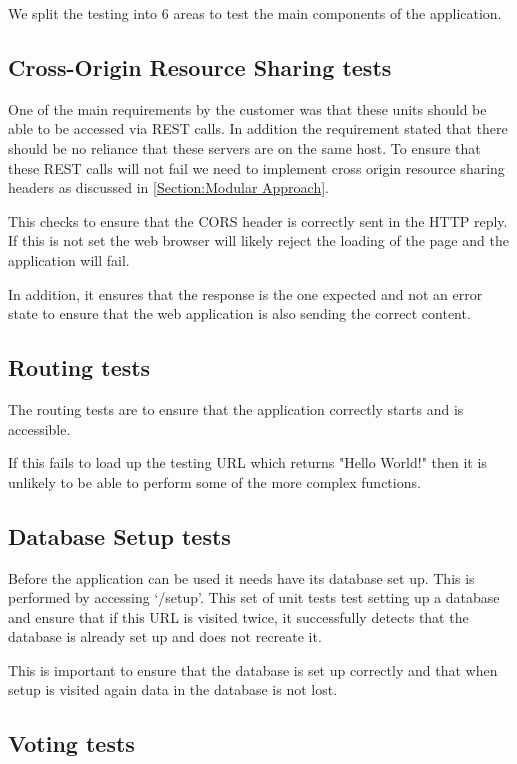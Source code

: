 We split the testing into 6 areas to test the main components of the application.

\subsection{Cross-Origin Resource Sharing tests}

One of the main requirements by the customer  was that these units should be able to be accessed via REST calls. In addition the requirement stated that there should be no reliance that these servers are on the same host. To ensure that these REST calls will not fail we need to implement cross origin resource sharing headers as discussed in \autoref{Section:Modular Approach}.

This checks to ensure that the CORS header is correctly sent in the HTTP reply. If this is not set the web browser will likely reject the loading of the page and the application will fail.

In addition, it ensures that the response is the one expected and not an error state to ensure that the web application is also sending the correct content.

\subsection{Routing tests}

The routing tests are to ensure that the application correctly starts and is accessible.

If this fails to load up the testing URL which returns "Hello World!" then it is unlikely to be able to perform some of the more complex functions.

\subsection{Database Setup tests}

Before the application can be used it needs have its database set up. This is performed by accessing `/setup'. This set of unit tests test setting up a database and ensure that if this URL is visited twice, it successfully detects that the database is already set up and does not recreate it. 

This is important to ensure that the database is set up correctly and that when setup is visited again data in the database is not lost.

\subsection{Voting tests}

